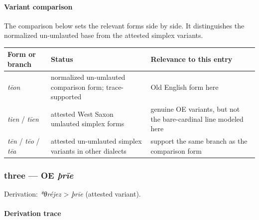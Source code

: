 \documentclass[
  british,
  a4paper,
]{article}
\newcounter{none} %
\begin{document}
\paragraph{Variant comparison}\label{variant-comparison-1}

The comparison below sets the relevant forms side by side. It
distinguishes the normalized un-umlauted base from the attested simplex
variants.

{\def\LTcaptype{none} %
\begin{longtable}[]{@{}
  >{\raggedright\arraybackslash}p{}
  >{\raggedright\arraybackslash}p{}
  >{\raggedright\arraybackslash}p{}@{}}
\toprule\noalign{}
\begin{minipage}[b]{\linewidth}\raggedright
Form or branch
\end{minipage} & \begin{minipage}[b]{\linewidth}\raggedright
Status
\end{minipage} & \begin{minipage}[b]{\linewidth}\raggedright
Relevance to this entry
\end{minipage} \\
\midrule\noalign{}
\endhead
\bottomrule\noalign{}
\endlastfoot
\emph{tēon} & normalized un-umlauted comparison form; trace-supported &
Old English form here \\
\emph{tien} / \emph{tīen} & attested West Saxon umlauted simplex forms &
genuine OE variants, but not the bare-cardinal line modeled here \\
\emph{tēn} / \emph{tēo} / \emph{tēa} & attested un-umlauted simplex
variants in other dialects & support the same branch as the comparison
form \\
\end{longtable}
}

\subsubsection{\texorpdfstring{three --- OE
\emph{þrīe}}{three --- OE þrīe}}\label{three-oe-uxferux12be}

Derivation: \emph{*θréjez} \textgreater{} \emph{þrīe} (attested
variant).

\paragraph{Derivation trace}\label{derivation-trace-84}
\end{document}
